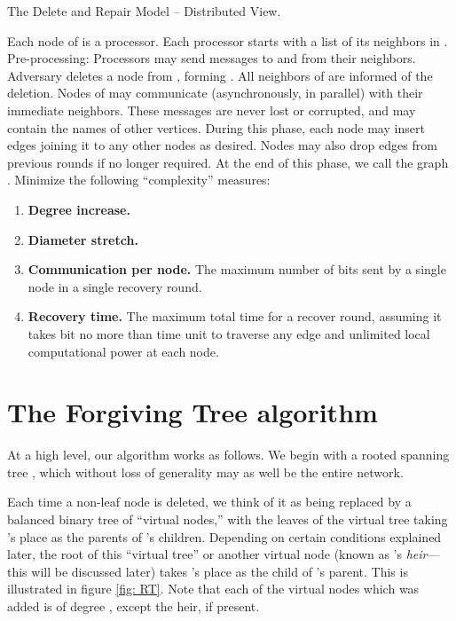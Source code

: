 \documentclass[11pt]{article}
\begin{document}

\begin{algorithm}[h!]
\caption{The Delete and Repair Model -- Distributed View.}
\label{algo:model-2}
\begin{algorithmic}
\STATE Each node of  is a processor.  
\STATE Each processor starts with a list of its neighbors in .
\STATE Pre-processing: Processors may send messages to and from
their neighbors.
\STATE Adversary deletes a node  from , forming .
\STATE All neighbors of  are informed of the deletion.
\STATE Nodes of  may communicate (asynchronously, in parallel) 
with their immediate neighbors.  These messages are never lost or
corrupted, and may contain the names of other vertices.
\STATE During this phase, each node may insert edges
joining it to any other nodes as desired. 
Nodes may also drop edges from previous rounds if no longer required.
\STATE At the end of this phase, we call the graph .
\ENDFOR
{} Minimize the following ``complexity'' measures:
 \begin{enumerate}
\item{\bf Degree increase.} 
\item {\bf Diameter stretch.} 
\item{\bf Communication per node.} The maximum number of bits sent by a single node in a single recovery round.
\item{\bf Recovery time.} The maximum total time for a recover round,
assuming it takes  bit no more than  time unit to traverse any edge and unlimited local computational power at each node.
\end{enumerate}
\end{algorithmic}
\end{algorithm}

  

\section{The Forgiving Tree algorithm}
\label{sec:algorithm}

At a high level, our algorithm works as follows. We begin with a
rooted spanning tree , which without loss of generality may as well
be the entire network.

Each time a non-leaf node  is deleted, we think of it as being
replaced by a balanced binary tree of ``virtual nodes,'' 
with the leaves of the virtual tree taking 's
place as the parents of 's children. Depending on certain
conditions explained later, the root of this ``virtual tree'' or
another virtual node (known as 's \emph{heir}---this will be
discussed later) takes 's place as the child of 's
parent. This is illustrated in figure \ref{fig: RT}.
Note that each of the virtual nodes which was added is of
degree , except the heir, if present.
\end{document}
